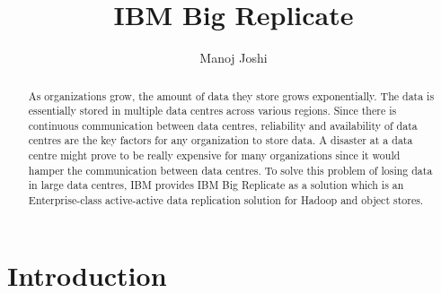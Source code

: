
\title{IBM Big Replicate}


\author{Manoj Joshi}

\renewcommand{\shortauthors}{Manoj}


\begin{abstract}
As organizations grow, the amount of data they store grows exponentially. The 
data is essentially stored in multiple data centres across various regions. 
Since there is continuous communication between data centres, reliability and 
availability of data centres are the key factors for any organization to store 
data. A disaster at a data centre might prove to be really expensive for many 
organizations since it would hamper the communication between data centres. To 
solve this problem of losing data in large data centres, IBM provides IBM Big
Replicate as a solution which is an Enterprise-class active-active data 
replication solution for Hadoop and object stores.
\end{abstract}



\maketitle

\section{Introduction}

